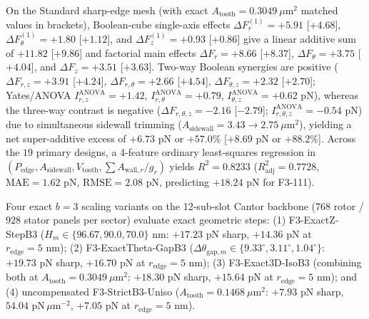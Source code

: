 \documentclass[11pt, a4paper]{article}
\begin{document}
On the Standard sharp-edge mesh (with exact $A_{\mathrm{tooth}} = 0.3049\ \mu\text{m}^2$ matched values in brackets), Boolean-cube single-axis effects $\Delta F_r^{(1)} = +5.91$ [$+4.68$], $\Delta F_\theta^{(1)} = +1.80$ [$+1.12$], and $\Delta F_z^{(1)} = +0.93$ [$+0.86$] give a linear additive sum of $+11.82$ [$+9.86$] and factorial main effects $\Delta F_r = +8.66$ [$+8.37$], $\Delta F_\theta = +3.75$ [$+4.04$], and $\Delta F_z = +3.51$ [$+3.63$]. Two-way Boolean synergies are positive ($\Delta F_{r,z} = +3.91$ [$+4.24$], $\Delta F_{r,\theta} = +2.66$ [$+4.54$], $\Delta F_{\theta,z} = +2.32$ [$+2.70$]; Yates/ANOVA $I_{r,z}^{\mathrm{ANOVA}} = +1.42$, $I_{r,\theta}^{\mathrm{ANOVA}} = +0.79$, $I_{\theta,z}^{\mathrm{ANOVA}} = +0.62\text{ pN}$), whereas the three-way contrast is negative ($\Delta F_{r,\theta,z} = -2.16$ [$-2.79$]; $I_{r,\theta,z}^{\mathrm{ANOVA}} = -0.54\text{ pN}$) due to simultaneous sidewall trimming ($A_{\mathrm{sidewall}} = 3.43 \to 2.75\ \mu\text{m}^2$), yielding a net super-additive excess of $+6.73\text{ pN}$ or $+57.0\%$ [$+8.69\text{ pN}$ or $+88.2\%$]. Across the $19$ primary designs, a 4-feature ordinary least-squares regression in $(P_{\mathrm{edge}}, A_{\mathrm{sidewall}}, V_{\mathrm{tooth}}, \sum A_{\mathrm{wall},r}/g_r)$ yields $R^2 = 0.8233$ ($R^2_{\mathrm{adj}} = 0.7728$, $\mathrm{MAE} = 1.62\text{ pN}$, $\mathrm{RMSE} = 2.08\text{ pN}$, predicting $+18.24\text{ pN}$ for F3-111).

Four exact $b=3$ scaling variants on the 12-sub-slot Cantor backbone ($768$ rotor / $928$ stator panels per sector) evaluate exact geometric steps: (1) F3-ExactZ-StepB3 ($H_m \in \{96.67, 90.0, 70.0\}\text{ nm}$: $+17.23\text{ pN}$ sharp, $+14.36\text{ pN}$ at $r_{\mathrm{edge}}=5\text{ nm}$); (2) F3-ExactTheta-GapB3 ($\Delta\theta_{\mathrm{gap},m} \in \{9.33^\circ, 3.11^\circ, 1.04^\circ\}$: $+19.73\text{ pN}$ sharp, $+16.70\text{ pN}$ at $r_{\mathrm{edge}}=5\text{ nm}$); (3) F3-Exact3D-IsoB3 (combining both at $A_{\mathrm{tooth}} = 0.3049\ \mu\text{m}^2$: $+18.30\text{ pN}$ sharp, $+15.64\text{ pN}$ at $r_{\mathrm{edge}}=5\text{ nm}$); and (4) uncompensated F3-StrictB3-Uniso ($A_{\mathrm{tooth}} = 0.1468\ \mu\text{m}^2$: $+7.93\text{ pN}$ sharp, $54.04\text{ pN}\,\mu\text{m}^{-2}$, $+7.05\text{ pN}$ at $r_{\mathrm{edge}}=5\text{ nm}$).
\end{document}
